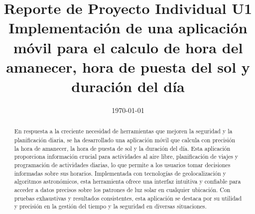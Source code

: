 \documentclass[conference]{IEEEtran}
\date{\specialdate\today}
\begin{document}
%
%
%

\newcommand{\breite}{0.9} %
\newcommand{\RelacionFiguradoscolumnas}{0.9}
\newcommand{\RelacionFiguradoscolumnasPuntoCinco}{0.45}




\title{Reporte de Proyecto Individual U1 \\ Implementación de una aplicación móvil para el calculo de hora del amanecer, hora de puesta del sol y duración del día}

\author{
}



\maketitle

\begin{abstract} 
\textbf{
}En respuesta a la creciente necesidad de herramientas que mejoren la seguridad y la planificación diaria, se ha desarrollado una aplicación móvil que calcula con precisión la hora de amanecer, la hora de puesta de sol y la duración del día. Esta aplicación proporciona información crucial para actividades al aire libre, planificación de viajes y programación de actividades diarias, lo que permite a los usuarios tomar decisiones informadas sobre sus horarios. Implementada con tecnologías de geolocalización y algoritmos astronómicos, esta herramienta ofrece una interfaz intuitiva y confiable para acceder a datos precisos sobre los patrones de luz solar en cualquier ubicación. Con pruebas exhaustivas y resultados consistentes, esta aplicación se destaca por su utilidad y precisión en la gestión del tiempo y la seguridad en diversas situaciones.
\end{abstract}
\end{document}
